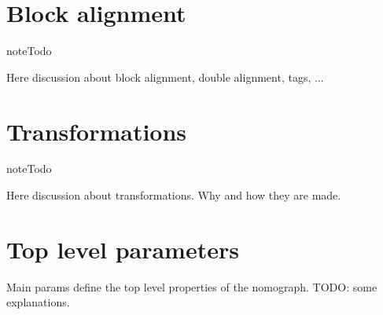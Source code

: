 \documentclass[a4paper,11pt,english]{sphinxmanual}
\begin{document}
\chapter{Block alignment}
\label{alignment/alignment:block-alignment}\label{alignment/alignment::doc}
\begin{notice}{note}{Todo}

Here discussion about block alignment, double alignment, tags, ...
\end{notice}


\chapter{Transformations}
\label{transformations/transformations::doc}\label{transformations/transformations:transformations}
\begin{notice}{note}{Todo}

Here discussion about transformations. Why and how they are made.
\end{notice}


\chapter{Top level parameters}
\label{main_params:top-level-parameters}\label{main_params::doc}
Main params define the top level properties of the nomograph. TODO: some explanations.
\end{document}
